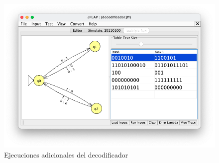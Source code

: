 \begin{figure}[H] 
	\centering
	\includegraphics[scale=0.55]{../practica_3/images/adicionales_decodificador.png} 
	\caption{Ejecuciones adicionales del decodificador} 
    \label{fig:adicionales_decodificador}
\end{figure}


